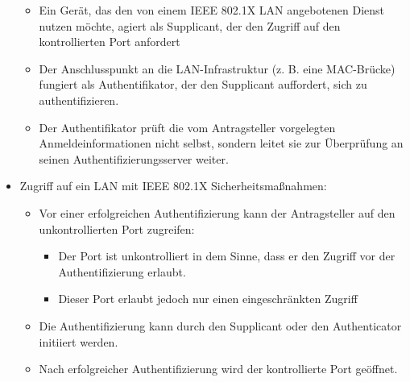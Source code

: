 \documentclass[a4paper]{article}
\begin{document}
\begin{multicols}{3}
\begin{itemize}
              \begin{itemize}
                  \item
                        Ein Gerät, das den von einem IEEE 802.1X LAN angebotenen Dienst
                        nutzen möchte, agiert als Supplicant, der den Zugriff auf den
                        kontrollierten Port anfordert
                  \item
                        Der Anschlusspunkt an die LAN-Infrastruktur (z. B. eine MAC-Brücke)
                        fungiert als Authentifikator, der den Supplicant auffordert, sich zu
                        authentifizieren.
                  \item
                        Der Authentifikator prüft die vom Antragsteller vorgelegten
                        Anmeldeinformationen nicht selbst, sondern leitet sie zur
                        Überprüfung an seinen Authentifizierungsserver weiter.
              \end{itemize}
        \item
              Zugriff auf ein LAN mit IEEE 802.1X Sicherheitsmaßnahmen:

              \begin{itemize}
                  \item
                        Vor einer erfolgreichen Authentifizierung kann der Antragsteller auf
                        den unkontrollierten Port zugreifen:

                        \begin{itemize}
                            \item
                                  Der Port ist unkontrolliert in dem Sinne, dass er den Zugriff vor
                                  der Authentifizierung erlaubt.
                            \item
                                  Dieser Port erlaubt jedoch nur einen eingeschränkten Zugriff
                        \end{itemize}
                  \item
                        Die Authentifizierung kann durch den Supplicant oder den
                        Authenticator initiiert werden.
                  \item
                        Nach erfolgreicher Authentifizierung wird der kontrollierte Port
                        geöffnet.
              \end{itemize}
    \end{itemize}


\end{multicols}
\end{document}
